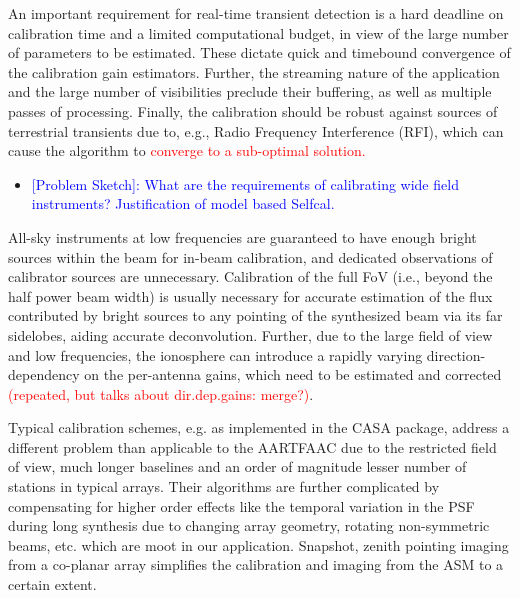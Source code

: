 \documentclass{aa}
\begin{document}
An important requirement for real-time transient detection is a hard
deadline on calibration time and a limited computational budget, in
view of the large number of parameters to be estimated. These dictate
quick and timebound convergence of the calibration gain estimators.
Further, the streaming nature of the application and the large number
of visibilities preclude their buffering, as well as multiple passes
of processing. Finally, the calibration should be robust against sources
of terrestrial transients due to, e.g., Radio Frequency Interference
(RFI), which can cause the algorithm to \textcolor{red}{converge to
a sub-optimal solution.}
\begin{itemize}
\item \textcolor{blue}{{[}Problem Sketch{]}: What are the requirements of
calibrating wide field instruments? Justification of model based Selfcal.}
\end{itemize}
All-sky instruments at low frequencies are guaranteed to have enough
bright sources within the beam for in-beam calibration, and dedicated
observations of calibrator sources are unnecessary. Calibration of
the full FoV (i.e., beyond the half power beam width) is usually necessary
for accurate estimation of the flux contributed by bright sources
to any pointing of the synthesized beam via its far sidelobes, aiding
accurate deconvolution. Further, due to the large field of view and
low frequencies, the ionosphere can introduce a rapidly varying direction-dependency
on the per-antenna gains, which need to be estimated and corrected
\textcolor{red}{(repeated, but talks about dir.dep.gains: merge?)}. 

{} Typical calibration schemes, e.g. as implemented in the CASA package,
address a different problem than applicable to the AARTFAAC due to
the restricted field of view, much longer baselines and an order of
magnitude lesser number of stations in typical arrays. Their algorithms
are further complicated by compensating for higher order effects like
the temporal variation in the PSF during long synthesis due to changing
array geometry, rotating non-symmetric beams, etc. which are moot
in our application. Snapshot, zenith pointing imaging from a co-planar
array simplifies the calibration and imaging from the ASM to a certain
extent. 
\end{document}
